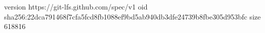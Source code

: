 version https://git-lfs.github.com/spec/v1
oid sha256:22dca791468f7cfa5fcd8fb1088ef9bd5ab940db3dfe24739b8fbe305d953bfc
size 618816
